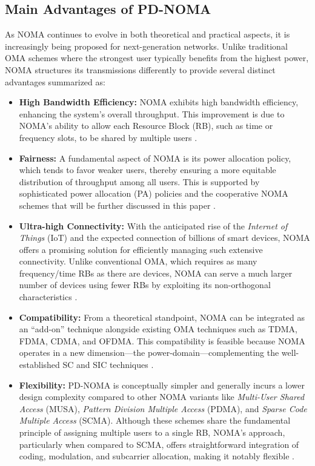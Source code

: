 \subsection{Main Advantages of PD-NOMA}

As NOMA continues to evolve in both theoretical and practical aspects, it is increasingly being proposed for next-generation networks. Unlike traditional OMA schemes where the strongest user typically benefits from the highest power, NOMA structures its transmissions differently to provide several distinct advantages summarized as:

\begin{itemize}
    \item \textbf{High Bandwidth Efficiency:} NOMA exhibits high bandwidth efficiency, enhancing the system's overall throughput. This improvement is due to NOMA's ability to allow each Resource Block (RB), such as time or frequency slots, to be shared by multiple users \cite{noma3}.
    \item \textbf{Fairness:} A fundamental aspect of NOMA is its power allocation policy, which tends to favor weaker users, thereby ensuring a more equitable distribution of throughput among all users. This is supported by sophisticated power allocation (PA) policies and the cooperative NOMA schemes that will be further discussed in this paper \cite{noma2}.
    \item \textbf{Ultra-high Connectivity:} With the anticipated rise of the \textit{Internet of Things} (IoT) and the expected connection of billions of smart devices, NOMA offers a promising solution for efficiently managing such extensive connectivity. Unlike conventional OMA, which requires as many frequency/time RBs as there are devices, NOMA can serve a much larger number of devices using fewer RBs by exploiting its non-orthogonal characteristics \cite{liu2020noma}.
    \item \textbf{Compatibility:} From a theoretical standpoint, NOMA can be integrated as an “add-on” technique alongside existing OMA techniques such as TDMA, FDMA, CDMA, and OFDMA. This compatibility is feasible because NOMA operates in a new dimension—the power-domain—complementing the well-established SC and SIC techniques \cite{makki2020survey}.
    \item \textbf{Flexibility:} PD-NOMA is conceptually simpler and generally incurs a lower design complexity compared to other NOMA variants like \textit{Multi-User Shared Access} (MUSA), \textit{Pattern Division Multiple Access} (PDMA), and \textit{Sparse Code Multiple Access} (SCMA). Although these schemes share the fundamental principle of assigning multiple users to a single RB, NOMA's approach, particularly when compared to SCMA, offers straightforward integration of coding, modulation, and subcarrier allocation, making it notably flexible \cite{nagma2}.
\end{itemize}

